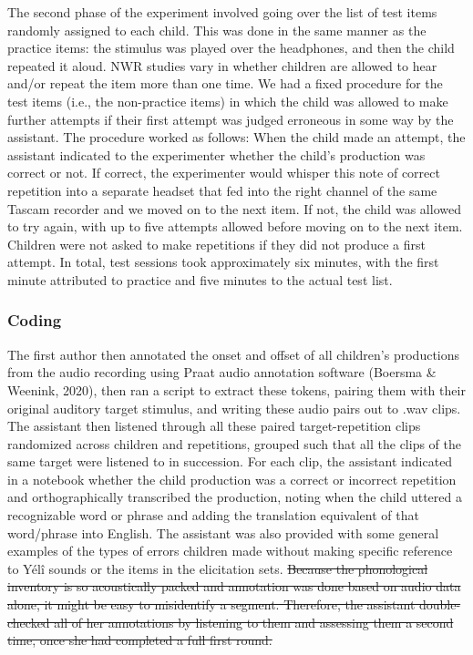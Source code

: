 \documentclass[english,,man,floatsintext]{apa6} %
\providecommand{\DIFdeltex}[1]{{\protect\color{red}\sout{#1}}}                      %
\providecommand{\DIFdelbegin}{} %
\providecommand{\DIFdelend}{} %
\providecommand{\DIFdel}[1]{\texorpdfstring{\DIFdeltex{#1}}{}} %
\newcommand{\DIFscaledelfig}{0.5}
\newlength{\DIFdelgraphicswidth} %
\newlength{\DIFdelgraphicsheight} %
\newcommand{\DIFdelincludegraphics}[2][]{%
	\sbox{\DIFdelgraphicsbox}{\DIFOincludegraphics[#1]{#2}}%
	\settoboxwidth{\DIFdelgraphicswidth}{\DIFdelgraphicsbox} %
	\settoboxtotalheight{\DIFdelgraphicsheight}{\DIFdelgraphicsbox} %
	\scalebox{\DIFscaledelfig}{%
		\parbox[b]{\DIFdelgraphicswidth}{\usebox{\DIFdelgraphicsbox}\\[-\baselineskip] \rule{\DIFdelgraphicswidth}{0em}}\llap{\resizebox{\DIFdelgraphicswidth}{\DIFdelgraphicsheight}{%
				\setlength{\unitlength}{\DIFdelgraphicswidth}%
				\begin{picture}(1,1)%
				\thicklines\linethickness{2pt} %
				{\color[rgb]{1,0,0}\put(0,0){\framebox(1,1){}}}%
				{\color[rgb]{1,0,0}\put(0,0){\line( 1,1){1}}}%
				{\color[rgb]{1,0,0}\put(0,1){\line(1,-1){1}}}%
				\end{picture}%
			}\hspace*{3pt}}} %
} %
\DeclareRobustCommand{\DIFdelbegin}{\DIFOdelbegin \let\includegraphics\DIFdelincludegraphics} %
\DeclareRobustCommand{\DIFdelend}{\DIFOaddend \let\includegraphics\DIFOincludegraphics} %
\begin{document}
The second phase of the experiment involved going over the list of test items randomly assigned to each child. This was done in the same manner as the practice items: the stimulus was played over the headphones, and then the child repeated it aloud. NWR studies vary in whether children are allowed to hear and/or repeat the item more than one time. We had a fixed procedure for the test items (i.e., the non-practice items) in which the child was allowed to make further attempts if their first attempt was judged erroneous in some way by the assistant. The procedure worked as follows: When the child made an attempt, the assistant indicated to the experimenter whether the child's production was correct or not. If correct, the experimenter would whisper this note of correct repetition into a separate headset that fed into the right channel of the same Tascam recorder and we moved on to the next item. If not, the child was allowed to try again, with up to five attempts allowed before moving on to the next item. Children were not asked to make repetitions if they did not produce a first attempt. In total, test sessions took approximately six minutes, with the first minute attributed to practice and five minutes to the actual test list.

\hypertarget{coding}{%
	\subsubsection{Coding}\label{coding}}

The first author then annotated the onset and offset of all children's productions from the audio recording using Praat audio annotation software (Boersma \& Weenink, 2020), then ran a script to extract these tokens, pairing them with their original auditory target stimulus, and writing these audio pairs out to .wav clips. The assistant then listened through all these paired target-repetition clips randomized across children and repetitions, grouped such that all the clips of the same target were listened to in succession. For each clip, the assistant indicated in a notebook whether the child production was a correct or incorrect repetition and orthographically transcribed the production, noting when the child uttered a recognizable word or phrase and adding the translation equivalent of that word/phrase into English. The assistant was also provided with some general examples of the types of errors children made without making specific reference to Yélî sounds or the items in the elicitation sets.
\DIFdelbegin \DIFdel{Because the phonological inventory is so acoustically packed and annotation was done based on audio data alone, it might be easy to misidentify a segment. Therefore, the assistant double-checked all of her annotations by listening to them and assessing them a second time, once she had completed a full first round.
}\DIFdelend 
\end{document}
